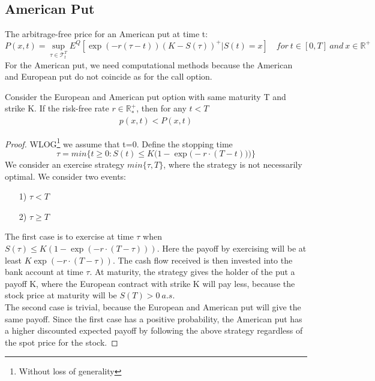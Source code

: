 \subsection{American Put}\label{americanPut}
The arbitrage-free price for an American put at time t:
\begin{equation}\label{AmericanPutPrice}
P(x,t)=\sup_{\tau \in \mathcal{T}_t^T} E^Q[\exp(-r(\tau-t)) (K-S(\tau))^+|S(t)=x] \quad for \ t\in [0,T] \ and \ x\in\mathbb{R}^+
\end{equation}
For the American put, we need computational methods because the American and European put do not coincide as for the call option.

\begin{proposition}{}
Consider the European and American put option with same maturity T and strike K. If the risk-free rate $r\in \mathbb{R}_*^+$, then for any $t<T$
\begin{equation}
\begin{split}
p(x,t)<P(x,t)
\end{split}
\end{equation}
\begin{proof}
WLOG\footnote{Without loss of generality} we assume that t=0. Define the stopping time
$$\tau = min \{t\geq 0 : S(t) \leq K\bigg(1-\exp\Big(-r\cdot (T-t)\Big)\bigg)\}$$
We consider an exercise strategy $min\{\tau, T\}$, where the strategy is not necessarily optimal. We consider two events:
\begin{enumerate}
\item[1)] $\tau<T$
\item[2)] $\tau \geq T$
\end{enumerate}
The first case is to exercise at time $\tau$ when $S(\tau) \leq K(1-\exp(-r\cdot (T-\tau)))$. Here the payoff by exercising will be at least $K\exp(-r\cdot (T-\tau))$. The cash flow received is then invested into the bank account at time $\tau$. At maturity, the strategy gives the holder of the put a payoff K, where the European contract with strike K will pay less, because the stock price at maturity will be $S(T)>0 \ a.s.$\\

The second case is trivial, because the European and American put will give the same payoff. Since the first case has a positive probability, the American put has a higher discounted expected payoff by following the above strategy regardless of the spot price for the stock. 
\end{proof}
\end{proposition}
